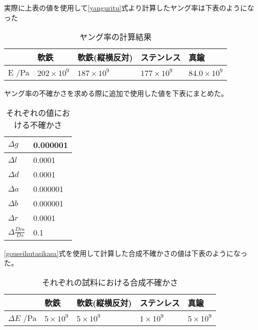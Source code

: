 \documentclass{jsarticle}
\begin{document}
実際に上表の値を使用して\ref{yanguritu}式より計算したヤング率は下表のようになった

\begin{table}[H]
    \centering
    \caption{ヤング率の計算結果}
    \label{my-label}
    \begin{tabular}{|l|l|l|l|l|}
    \hline
      & 軟鉄           & 軟鉄(縦横反対)           & ステンレス  & 真鍮          \\ \hline
    E /Pa & $202\times 10^9$ & $187\times10^9$ & $177 \times 10^9$ & $84.0 \times 10^9$ \\ \hline
    \end{tabular}
    \end{table}

ヤング率の不確かさを求める際に追加で使用した値を下表にまとめた。

    \begin{table}[H]
        \centering
        \caption{それぞれの値における不確かさ}
        \label{my-label}
        \begin{tabular}{|l|l|}
        \hline
        $\Delta g$       & 0.000001 \\ \hline
        $\Delta l$       & 0.0001   \\ \hline
        $\Delta d$       & 0.0001   \\ \hline
        $\Delta a$       & 0.000001 \\ \hline
        $\Delta b$       & 0.000001 \\ \hline
        $\Delta r$       & 0.0001   \\ \hline
        $\Delta\frac{Dm}{Ds}$ & 0.1      \\ \hline
        \end{tabular}
        \end{table}

\ref{gouseihutasikasa}式を使用して計算した合成不確かさの値は下表のようになった。

\begin{table}[H]
    \centering
    \caption{それぞれの試料における合成不確かさ}
    \label{my-label}
    \begin{tabular}{|l|l|l|l|l|}
    \hline
       & 軟鉄        & 軟鉄(縦横反対)        & ステンレス    & 真鍮        \\ \hline
    $\Delta E$ /Pa & $5\times 10^9$  & $5\times 10^9$ & $1\times 10^9$ & $5\times 10^9$ \\ \hline
    \end{tabular}
    \end{table}
\end{document}
